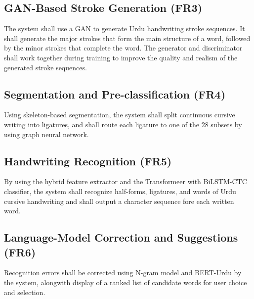 \documentclass[12pt,a4paper]{report}
\begin{document}
\subsection{GAN-Based Stroke Generation (FR3)}
The system shall use a GAN to generate Urdu handwriting stroke sequences. It shall generate the major strokes that form the main structure of a word, followed by the minor strokes that complete the word. The generator and discriminator shall work together during training to improve the quality and realism of the generated stroke sequences.

\subsection{Segmentation and Pre-classification (FR4)}
Using skeleton-based segmentation, the system shall split continuous cursive writing into ligatures, and shall route each ligature to one of the 28 subsets by using graph neural network.

\subsection{Handwriting Recognition (FR5)}
By using the hybrid feature extractor and the Transformeer with BiLSTM-CTC classifier, the system shall recognize half-forms, ligatures, and words of Urdu cursive handwriting and shall output a character sequence fore each written word.

\subsection{Language-Model Correction and Suggestions (FR6)}
Recognition errors shall be corrected using N-gram model and BERT-Urdu by the system, alongwith display of a ranked list of candidate words for user choice and selection.
\end{document}
